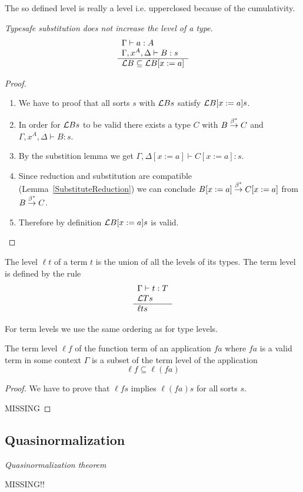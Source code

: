The so defined level is really a level i.e. upperclosed because of the
cumulativity.


\begin{theorem}
    \emph{Typesafe substitution does not increase the level of a type}.
    $$
    \begin{array}{l} 
        \Gamma \vdash a: A
        \\
        \Gamma, x^A, \Delta \vdash B: s
     \\ \hline {\cal L} B \subseteq {\cal L} B[x:=a]\end{array}
    $$


    \begin{proof}
    \begin{enumerate}
        \item We have to proof that all sorts $s$ with ${\cal L} B s$ satisfy
        ${\cal L} B[x:=a] s$.

        \item In order for ${\cal L} B s$ to be valid there exists a type $C$ with $B
        \stackrel{\beta^*}{\to} C$ and $\Gamma, x^A, \Delta \vdash B: s$.

        \item By the substition lemma we get $\Gamma, \Delta[x:=a] \vdash C[x:=a]: s$.

        \item Since reduction and substitution are compatible
            (Lemma~\ref{SubstituteReduction})
            we can conclude $B[x:=a]
        \stackrel{\beta^*}{\to} C[x:=a]$  from $B \stackrel{\beta^*}{\to} C$.

        \item Therefore by definition ${\cal L} B[x:=a] s$ is valid.
    \end{enumerate}
    \end{proof}
\end{theorem}



\begin{definition}
    The level $\ell t$ of a term $t$ is the union of all the levels of its
    types. The term level is defined by the rule
    $$
    \begin{array}{l} 
        \Gamma \vdash t: T
        \\
        {\cal L} T s
     \\ \hline 
        \ell t s
    \end{array}
    $$
\end{definition}

For term levels we use the same ordering as for type levels.


\begin{theorem}
    The term level $\ell f$ of the function term of an application $f a$ where
    $f a$ is a valid term in some context $\Gamma$ is a subset of the term level
    of the application
    $$
    \ell f \subseteq \ell (f a)
    $$

    \begin{proof}

        We have to prove that $\ell f s$ implies $\ell (f a) s$ for all sorts $s$.

        MISSING
    \end{proof}
\end{theorem}


\subsection{Quasinormalization}


\begin{theorem}
    \label{quasinormalization}
    \emph{Quasinormalization theorem}

    MISSING!!
\end{theorem}
